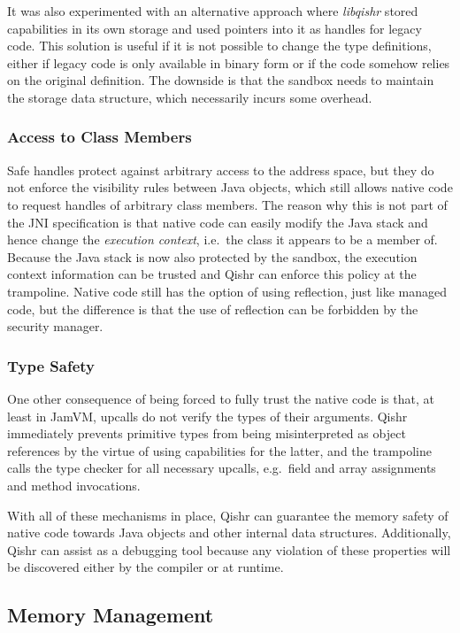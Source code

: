 \documentclass[a4paper,12pt,twoside,openright]{report}
\newcommand{\tool}[1]{\emph{#1}}
\newcommand{\lib}[1]{\tool{lib#1}}
\begin{document}
It was also experimented with an alternative approach where \lib{qishr} stored capabilities in its own storage and used pointers into it as handles for legacy code. This solution is useful if it is not possible to change the type definitions, either if legacy code is only available in binary form or if the code somehow relies on the original definition. The downside is that the sandbox needs to maintain the storage data structure, which necessarily incurs some overhead.

\subsubsection{Access to Class Members}

Safe handles protect against arbitrary access to the address space, but they do not enforce the visibility rules between Java objects, which still allows native code to request handles of arbitrary class members. The reason why this is not part of the JNI specification is that native code can easily modify the Java stack and hence change the \emph{execution context}, i.e.\ the class it appears to be a member of. Because the Java stack is now also protected by the sandbox, the execution context information can be trusted and Qishr can enforce this policy at the trampoline. Native code still has the option of using reflection, just like managed code, but the difference is that the use of reflection can be forbidden by the security manager.

\subsubsection{Type Safety}

One other consequence of being forced to fully trust the native code is that, at least in JamVM, upcalls do not verify the types of their arguments. Qishr immediately prevents primitive types from being misinterpreted as object references by the virtue of using capabilities for the latter, and the trampoline calls the type checker for all necessary upcalls, e.g.\ field and array assignments and method invocations.

With all of these mechanisms in place, Qishr can guarantee the memory safety of native code towards Java objects and other internal data structures. Additionally, Qishr can assist as a debugging tool because any violation of these properties will be discovered either by the compiler or at runtime.

\subsection{Memory Management}
\end{document}
